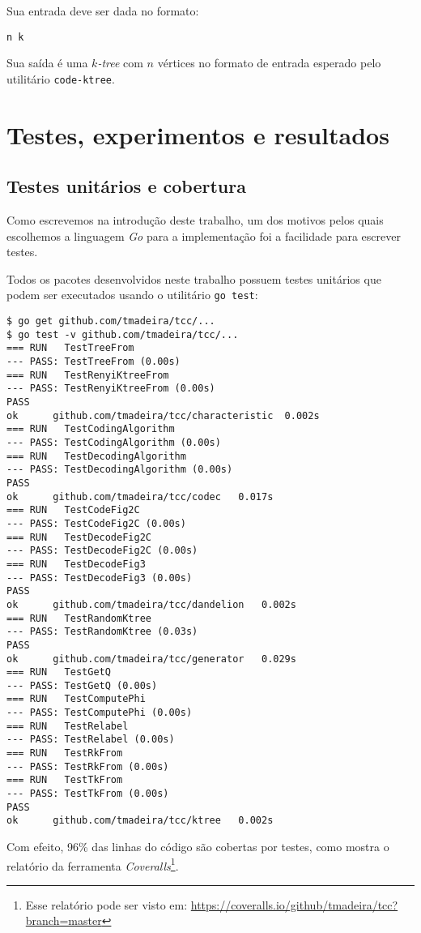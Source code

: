 Sua entrada deve ser dada no formato:

\begin{lstlisting}
n k
\end{lstlisting}

Sua saída é uma \emph{$k$-tree} com $n$ vértices no formato de entrada esperado pelo utilitário {\tt code-ktree}.

\section{Testes, experimentos e resultados}

\subsection{Testes unitários e cobertura}

Como escrevemos na introdução deste trabalho, um dos motivos pelos quais escolhemos a linguagem \emph{Go} para a implementação foi a facilidade para escrever testes.

Todos os pacotes desenvolvidos neste trabalho possuem testes unitários que podem ser executados usando o utilitário {\tt go test}:

\begin{lstlisting}
$ go get github.com/tmadeira/tcc/...
$ go test -v github.com/tmadeira/tcc/...
=== RUN   TestTreeFrom
--- PASS: TestTreeFrom (0.00s)
=== RUN   TestRenyiKtreeFrom
--- PASS: TestRenyiKtreeFrom (0.00s)
PASS
ok  	github.com/tmadeira/tcc/characteristic	0.002s
=== RUN   TestCodingAlgorithm
--- PASS: TestCodingAlgorithm (0.00s)
=== RUN   TestDecodingAlgorithm
--- PASS: TestDecodingAlgorithm (0.00s)
PASS
ok  	github.com/tmadeira/tcc/codec	0.017s
=== RUN   TestCodeFig2C
--- PASS: TestCodeFig2C (0.00s)
=== RUN   TestDecodeFig2C
--- PASS: TestDecodeFig2C (0.00s)
=== RUN   TestDecodeFig3
--- PASS: TestDecodeFig3 (0.00s)
PASS
ok  	github.com/tmadeira/tcc/dandelion	0.002s
=== RUN   TestRandomKtree
--- PASS: TestRandomKtree (0.03s)
PASS
ok  	github.com/tmadeira/tcc/generator	0.029s
=== RUN   TestGetQ
--- PASS: TestGetQ (0.00s)
=== RUN   TestComputePhi
--- PASS: TestComputePhi (0.00s)
=== RUN   TestRelabel
--- PASS: TestRelabel (0.00s)
=== RUN   TestRkFrom
--- PASS: TestRkFrom (0.00s)
=== RUN   TestTkFrom
--- PASS: TestTkFrom (0.00s)
PASS
ok  	github.com/tmadeira/tcc/ktree	0.002s
\end{lstlisting}

Com efeito, 96\% das linhas do código são cobertas por testes, como mostra o relatório da ferramenta \emph{Coveralls}\footnote{Esse relatório pode ser visto em: \url{https://coveralls.io/github/tmadeira/tcc?branch=master}}.

